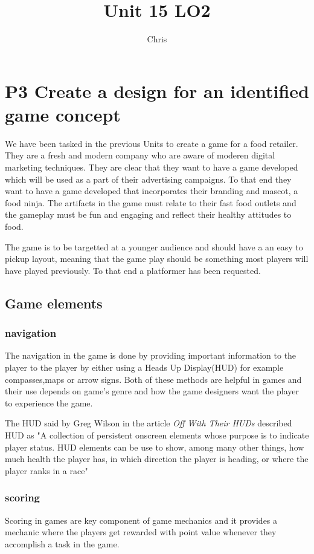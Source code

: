 \documentclass{article}
\title{Unit 15 LO2}
\author{Chris}
\date{}
\begin{document}
\maketitle
\tableofcontents
\break

\section{P3 Create a design for an identified game concept}
We have been tasked in the previous Units to create a game for a food retailer. They are a fresh and modern company who are aware of moderen digital marketing techniques.
They are clear that they want to have a game developed which will be used as a part of their advertising campaigns. To that end they want to have a game developed that incorporates their branding and mascot, a food ninja.
The artifacts in the game must relate to their fast food outlets and the gameplay must be fun and engaging and reflect their healthy attitudes to food. 

The game is to be targetted at a younger audience and should have a an easy to pickup layout, meaning that the game play should be something most players will have played previously. To that end a platformer has been requested. 

\subsection{Game elements}
\subsubsection{navigation}
The navigation in the game is done by providing important information to the player to the player by either using a Heads Up Display(HUD) for example compasses,maps or arrow signs. Both of these methods are helpful in games and their use depends on game's genre and how the game designers want the player to experience the game.

The HUD said by Greg Wilson in the article \textit{Off With Their HUDs} described HUD as "A collection of persistent onscreen elements whose purpose is to indicate player status. HUD elements can be use to show, among many other things, how much health the player has, in which direction the player is heading, or where the player ranks in a race" 



\subsubsection{scoring}
Scoring in games are key component of game mechanics and it provides a mechanic where the players get rewarded with point value whenever they accomplish a task in the game.   
\end{document}
